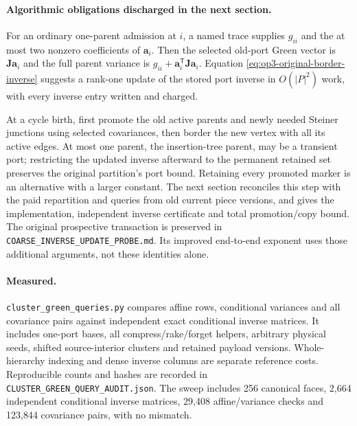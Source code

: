 \paragraph{Algorithmic obligations discharged in the next section.}
For an ordinary one-parent admission at $i$, a named trace supplies
$g_{ii}$ and the at most two nonzero coefficients of $\boldsymbol a_i$.
Then the selected old-port Green vector is
$\boldsymbol J\boldsymbol a_i$ and the full parent variance is
$g_{ii}+\boldsymbol a_i^{\mathsf T}\boldsymbol J\boldsymbol a_i$.
Equation \eqref{eq:op3-original-border-inverse} suggests a rank-one update
of the stored port inverse in $O(|P|^2)$ work, with every inverse entry
written and charged.

At a cycle birth, first promote the old active parents and newly needed
Steiner junctions using selected covariances, then border the new vertex
with all its active edges. At most one parent, the insertion-tree parent,
may be a transient port; restricting the updated inverse afterward to the
permanent retained set preserves the original partition's port bound.
Retaining every promoted marker is an alternative with a larger constant.
The next section reconciles this step with the paid repartition and
queries from old current piece versions, and gives the implementation,
independent inverse certificate and total promotion/copy bound. The
original prospective transaction is preserved in
\texttt{COARSE\_INVERSE\_UPDATE\_PROBE.md}. Its improved end-to-end exponent
uses those additional arguments, not these identities alone.

\paragraph{Measured.}
\texttt{cluster\_green\_queries.py} compares affine rows, conditional
variances and all covariance pairs against independent exact conditional
inverse matrices. It includes one-port bases, all compress/rake/forget
helpers, arbitrary physical seeds, shifted source-interior clusters and
retained payload versions. Whole-hierarchy indexing and dense inverse
columns are separate reference costs. Reproducible counts and hashes are
recorded in \texttt{CLUSTER\_GREEN\_QUERY\_AUDIT.json}. The sweep includes
256 canonical faces, 2,664 independent conditional inverse matrices,
29,408 affine/variance checks and 123,844 covariance pairs, with no mismatch.
